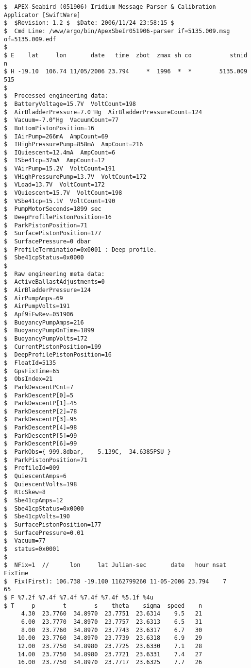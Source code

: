 {\small
\begin{verbatim}
$  APEX-Seabird (051906) Iridium Message Parser & Calibration Applicator [SwiftWare]
$  $Revision: 1.2 $  $Date: 2006/11/24 23:58:15 $
$  Cmd Line: /www/argo/bin/ApexSbeIr051906-parser if=5135.009.msg of=5135.009.edf 
$
$ E    lat     lon       date   time  zbot  zmax sh co           stnid      n
$ H -19.10  106.74 11/05/2006 23.794     *  1996  *  *        5135.009    515
$
$  Processed engineering data:
$  BatteryVoltage=15.7V  VoltCount=198
$  AirBladderPressure=7.0"Hg  AirBladderPressureCount=124
$  Vacuum=-7.0"Hg  VacuumCount=77
$  BottomPistonPosition=16
$  IAirPump=266mA  AmpCount=69
$  IHighPressurePump=858mA  AmpCount=216
$  IQuiescent=12.4mA  AmpCount=6
$  ISbe41cp=37mA  AmpCount=12
$  VAirPump=15.2V  VoltCount=191
$  VHighPressurePump=13.7V  VoltCount=172
$  VLoad=13.7V  VoltCount=172
$  VQuiescent=15.7V  VoltCount=198
$  VSbe41cp=15.1V  VoltCount=190
$  PumpMotorSeconds=1899 sec
$  DeepProfilePistonPosition=16
$  ParkPistonPosition=71
$  SurfacePistonPosition=177
$  SurfacePressure=0 dbar
$  ProfileTermination=0x0001 : Deep profile.
$  Sbe41cpStatus=0x0000
$
$  Raw engineering meta data:
$  ActiveBallastAdjustments=0
$  AirBladderPressure=124
$  AirPumpAmps=69
$  AirPumpVolts=191
$  Apf9iFwRev=051906
$  BuoyancyPumpAmps=216
$  BuoyancyPumpOnTime=1899
$  BuoyancyPumpVolts=172
$  CurrentPistonPosition=199
$  DeepProfilePistonPosition=16
$  FloatId=5135
$  GpsFixTime=65
$  ObsIndex=21
$  ParkDescentPCnt=7
$  ParkDescentP[0]=5
$  ParkDescentP[1]=45
$  ParkDescentP[2]=78
$  ParkDescentP[3]=95
$  ParkDescentP[4]=98
$  ParkDescentP[5]=99
$  ParkDescentP[6]=99
$  ParkObs={ 999.8dbar,    5.139C,  34.6385PSU }
$  ParkPistonPosition=71
$  ProfileId=009
$  QuiescentAmps=6
$  QuiescentVolts=198
$  RtcSkew=8
$  Sbe41cpAmps=12
$  Sbe41cpStatus=0x0000
$  Sbe41cpVolts=190
$  SurfacePistonPosition=177
$  SurfacePressure=0.01
$  Vacuum=77
$  status=0x0001
$
$  NFix=1  //      lon     lat Julian-sec       date   hour nsat FixTime
$  Fix(First): 106.738 -19.100 1162799260 11-05-2006 23.794    7      65
$ F %7.2f %7.4f %7.4f %7.4f %7.4f %5.1f %4u
$ T     p        t        s    theta    sigma  speed    n
     4.30  23.7760  34.8970  23.7751  23.6314    9.5   21
     6.00  23.7770  34.8970  23.7757  23.6313    6.5   31
     8.00  23.7760  34.8970  23.7743  23.6317    6.7   30
    10.00  23.7760  34.8970  23.7739  23.6318    6.9   29
    12.00  23.7750  34.8980  23.7725  23.6330    7.1   28
    14.00  23.7750  34.8980  23.7721  23.6331    7.4   27
    16.00  23.7750  34.8970  23.7717  23.6325    7.7   26

\end{verbatim}}
